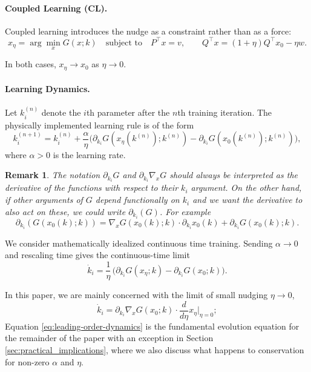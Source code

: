 \documentclass[final, 11pt, nonatbib]{elsarticle}
\theoremstyle{definition}
\theoremstyle{plain}
\newtheorem{remark}[definition]{Remark}
\numberwithin{equation}{section}
\begin{document}
\paragraph{Coupled Learning (CL).}
Coupled learning introduces the nudge as a constraint rather than as a force:
\begin{equation}
    x_\eta
    = \arg\min_{x} G(x;k)
    \quad\text{subject to}\quad
    P^\top x = v, 
    \qquad 
    Q^\top x =(1+\eta)Q^\top x_0 -\eta w .
    \label{eq:CL}
\end{equation}

In both cases, $x_\eta \to x_0$ as $\eta \to 0$.

\paragraph{Learning Dynamics.}

Let $k_i^{(n)}$ denote the $i$th parameter after the $n$th training iteration.
The physically implemented learning rule is of the form
\begin{equation}
    k_i^{(n+1)} 
    = k_i^{(n)}
      + \dfrac{\alpha}{\eta}\big(
      \partial_{k_i}G(x_\eta(k^{(n)});k^{(n)}) 
           - \partial_{k_i}G(x_0(k^{(n)});k^{(n)}) \big),
           \label{Learning_dynamics}
\end{equation}
where $\alpha>0$ is the learning rate.
\begin{remark}
    The notation $\partial_{k_i}G$ and $\partial_{k_i}\nabla_xG$ should always be interpreted as the derivative of the functions with respect to their $k_i$ argument. On the other hand, if other arguments of $G$ depend functionally on $k_i$ and we want the derivative to also act on these, we could write $\partial_{k_i}(G)$. For example
    \[
    \partial_{k_i}(G(x_0(k);k)) = \nabla_{x}G(x_0(k);k) \cdot \partial_{k_i}x_0(k) + \partial_{k_i}G(x_0(k);k).
\]
\end{remark}

We consider mathematically idealized continuous time training. Sending $\alpha \to 0$ and rescaling time gives the continuous-time limit
\begin{equation}
    \dot{k}_i
    =
    \dfrac{1}{\eta}\,\big(\partial_{k_i}
        G(x_\eta;k) - \partial_{k_i}G(x_0;k)
    \big).
    \label{eq:continuous-dynamics}
\end{equation}

In this paper, we are mainly concerned with the limit of small nudging $\eta \to 0$,
\begin{equation}
    \dot{k}_i
    =
   \partial_{k_i}
     \nabla_x G(x_0;k)\cdot \dfrac{d}{d\eta}x_\eta\bigg|_{\eta=0};
    \label{eq:leading-order-dynamics}
\end{equation}
Equation 
\eqref{eq:leading-order-dynamics} is the fundamental evolution equation for the remainder of the paper with an exception in Section \ref{sec:practical_implications}, where we also discuss what happens to conservation for non-zero $\alpha$ and $\eta$.
\end{document}
